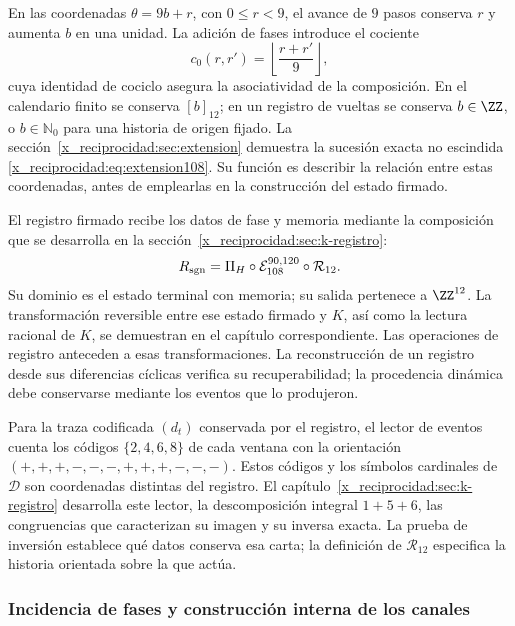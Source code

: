 En las coordenadas \(\theta=9b+r\), con \(0\leq r<9\), el avance
de \(9\) pasos conserva \(r\) y aumenta \(b\) en una unidad.
La adición de fases introduce el cociente
\[
 c_0(r,r')=\left\lfloor\frac{r+r'}9\right\rfloor,
\]
cuya identidad de cociclo asegura la asociatividad de la composición.
En el calendario finito se conserva \([b]_{12}\); en un registro de
vueltas se conserva \(b\in\ZZ\), o \(b\in\mathbb N_0\) para
una historia de origen fijado. La sección~\ref{x_reciprocidad:sec:extension} demuestra
la sucesión exacta no escindida \eqref{x_reciprocidad:eq:extension108}. Su función es
describir la relación entre estas coordenadas, antes de emplearlas en la
construcción del estado firmado.

El registro firmado recibe los datos de fase y memoria mediante la
composición que se desarrolla en la sección~\ref{x_reciprocidad:sec:k-registro}:
\begin{equation}
 R_{\rm sgn}=\Pi_H\circ\mathcal E_{108}^{90,120}
                         \circ\mathcal R_{12}.
 \label{x_reciprocidad:tpk-int:registro-causal}
\end{equation}
Su dominio es el estado terminal con memoria; su salida pertenece a
\(\ZZ^{12}\). La transformación reversible entre ese estado firmado
y \(K\), así como la lectura racional de \(K\), se demuestran en
el capítulo correspondiente. Las operaciones de registro anteceden a
esas transformaciones. La reconstrucción de un registro desde sus
diferencias cíclicas verifica su recuperabilidad; la procedencia dinámica
debe conservarse mediante los eventos que lo produjeron.

Para la traza codificada \((d_t)\) conservada por el registro, el
lector de eventos cuenta los códigos \(\{2,4,6,8\}\) de cada
ventana con la orientación
\((+,+,+,-,-,-,+,+,+,-,-,-)\). Estos códigos y los símbolos
cardinales de \(\mathcal D\) son coordenadas distintas del
registro. El capítulo~\ref{x_reciprocidad:sec:k-registro} desarrolla este lector,
la descomposición integral \(1+5+6\), las congruencias que
caracterizan su imagen y su inversa exacta. La prueba de inversión
establece qué datos conserva esa carta; la definición de
\(\mathcal R_{12}\) especifica la historia orientada sobre la que
actúa.

\subsubsection{Incidencia de fases y construcción interna de los canales}
\label{x_reciprocidad:tpk-int:incidencia}


